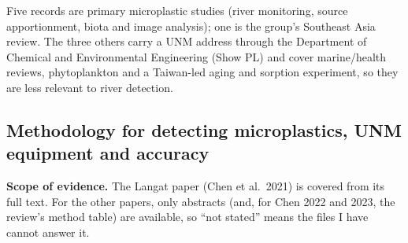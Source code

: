 \documentclass[11pt,a4paper]{article}
\newcommand{\flag}[1]{\textcolor{accent}{\textbf{#1}}}
\begin{document}
Five records are primary microplastic studies (river monitoring, source apportionment, biota and image analysis); one is the group's Southeast Asia review. The three others carry a UNM address through the Department of Chemical and Environmental Engineering (Show PL) and cover marine/health reviews, phytoplankton and a Taiwan-led aging and sorption experiment, so they are less relevant to river detection.

\subsection{Methodology for detecting microplastics, UNM equipment and accuracy}\label{sec:method}
\flag{Scope of evidence.} The Langat paper (Chen et al.\ 2021) is covered from its full text. For the other papers, only abstracts (and, for Chen 2022 and 2023, the review's method table) are available, so ``not stated'' means the files I have cannot answer it.
\end{document}
